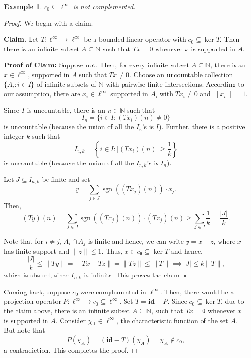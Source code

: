 \documentclass[12pt]{article}
\theoremstyle{thmstyle}
\theoremstyle{defstyle}
\newtheorem{example}[theorem]{Example}
\newcommand{\N}{\mathbb{N}}
\newcommand{\id}{\mathbf{id}}
\newcommand{\sgn}{\operatorname{sgn}}
\renewcommand{\le}{\leqslant}
\renewcommand{\ge}{\geqslant}
\begin{document}
\begin{example}
    $c_0\subseteq\ell^\infty$ is not complemented.
\end{example}
\begin{proof}
We begin with a claim. 

\noindent\textbf{Claim.} Let $T: \ell^\infty\to\ell^\infty$ be a bounded linear operator with $c_0\subseteq\ker T$. Then there is an infinite subset $A\subseteq\N$ such that $Tx = 0$ whenever $x$ is supported in $A$.

\noindent\textbf{Proof of Claim:} Suppose not. Then, for every infinite subset $A\subseteq\N$, there is an $x\in\ell^\infty$, supported in $A$ such that $Tx\ne 0$. Choose an uncountable collection $\{A_i\colon i\in I\}$ of infinite subsets of $\N$ with pairwise finite intersections. According to our assumption, there are $x_i\in\ell^\infty$ supported in $A_i$ with $Tx_i\ne 0$ and $\|x_i\| = 1$.

Since $I$ is uncountable, there is an $n\in\N$ such that 
\begin{equation*}
    I_n = \{i\in I\colon (Tx_i)(n)\ne 0\}
\end{equation*}
is uncountable (because the union of all the $I_n$'s is $I$). Further, there is a positive integer $k$ such that 
\begin{equation*}
    I_{n, k} = \left\{i\in I\colon |(Tx_i)(n)|\ge\frac
    1k\right\}
\end{equation*}
is uncountable (because the union of all the $I_{n, k}$'s is $I_n$).

Let $J\subseteq I_{n, k}$ be finite and set 
\begin{equation*}
    y = \sum_{j\in J}\sgn\left((Tx_j)(n)\right)\cdot x_j.
\end{equation*}
Then, 
\begin{equation*}
    (Ty)(n) = \sum_{j\in J}\sgn\left((Tx_j)(n)\right)\cdot(Tx_j)(n)\ge\sum_{j\in J}\frac{1}{k} = \frac{|J|}{k}.
\end{equation*}

Note that for $i\ne j$, $A_i\cap A_j$ is finite and hence, we can write $y = x + z$, where $x$ has finite support and $\|z\|\le 1$. Thus, $x\in c_0\subseteq\ker T$ and hence, 
\begin{equation*}
    \frac{|J|}{k}\le\|Ty\| = \|Tx + Tz\| = \|Tz\|\le\|T\|\implies|J|\le k\|T\|,
\end{equation*}
which is absurd, since $I_{n, k}$ is infinite. This proves the claim. $\square$

Coming back, suppose $c_0$ were complemented in $\ell^\infty$. Then, there would be a projection operator $P: \ell^\infty\to c_0\subseteq\ell^\infty$. Set $T = \id - P$. Since $c_0\subseteq\ker T$, due to the claim above, there is an infinite subset $A\subseteq\N$, such that $Tx = 0$ whenever $x$ is supported in $A$. Consider $\chi_A \in\ell^\infty$, the characteristic function of the set $A$. But note that 
\begin{equation*}
    P(\chi_A) = (\id - T)(\chi_A) = \chi_A\notin c_0,
\end{equation*}
a contradiction. This completes the proof.
\end{proof}
\end{document}
